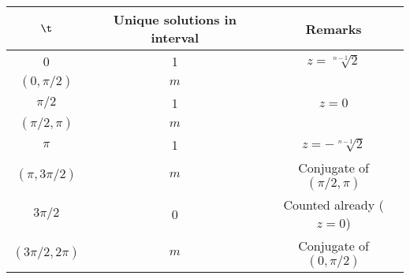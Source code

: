\begin{solution}
    \begin{table}[H]
        \centering
        \begin{tabular}{|c|c|c|}
        \hline
        $\t$ & Unique solutions in interval & Remarks \\ \hline\hline
        0 & 1 & $z = \sqrt[n-1]{2}$ \\ \hline
        $(0, \pi/2)$ & $m$ &  \\ \hline
        $\pi/2$ & 1 & $z = 0$ \\ \hline
        $(\pi/2, \pi)$ & $m$ &  \\ \hline
        $\pi$ & 1 & $z = -\sqrt[n-1]{2}$ \\ \hline
        $(\pi, 3\pi/2)$ & $m$ &  Conjugate of $(\pi/2, \pi)$\\ \hline
        $3\pi/2$ & 0 & Counted already ($z = 0$) \\ \hline
        $(3\pi/2, 2\pi)$ & $m$ & Conjugate of $(0, \pi/2)$ \\ \hline
        \end{tabular}
    \end{table}
\end{solution}

